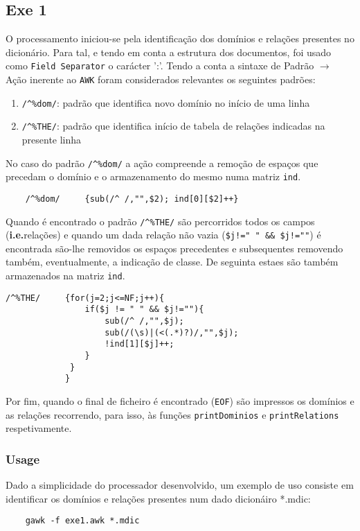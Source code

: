 \documentclass{llncs}
\begin{document}
\subsection{Exe 1}
O processamento iniciou-se pela identificação dos domínios e relações presentes no dicionário. Para tal, e tendo em conta a estrutura dos documentos, foi usado como \texttt{Field Separator} o carácter ':'.
Tendo a conta a sintaxe de Padrão $\to$ Ação inerente ao \texttt{AWK} foram considerados relevantes os seguintes padrões:
\begin{enumerate}
    \item \verb|/^%dom/|: padrão que identifica novo domínio no início de uma linha
    \item \verb|/^%THE/|: padrão que identifica início de tabela de relações indicadas na presente linha
\end{enumerate}
No caso do padrão \verb|/^%dom/| a ação compreende a remoção de espaços que precedam o domínio e o armazenamento do mesmo numa matriz \texttt{ind}.
\begin{Verbatim}
    /^%dom/     {sub(/^ /,"",$2); ind[0][$2]++}
\end{Verbatim}
Quando é encontrado o padrão \verb|/^%THE/| são percorridos todos os campos (\textbf{i.e.}relações) e quando um dada relação não vazia (\verb|$j!=" " && $j!=""|) é encontrada são-lhe removidos os espaços precedentes e subsequentes removendo também, eventualmente, a indicação de classe. De seguinta estaes são também armazenados na matriz \texttt{ind}.
\begin{Verbatim}
/^%THE/     {for(j=2;j<=NF;j++){
                if($j != " " && $j!=""){
                    sub(/^ /,"",$j);           
                    sub(/(\s)|(<(.*)?)/,"",$j);
                    !ind[1][$j]++;
                }                              
             }
            }

\end{Verbatim}

Por fim, quando o final de ficheiro é encontrado (\texttt{EOF}) são impressos os domínios e as relações recorrendo, para isso, às funções \texttt{printDominios} e \texttt{printRelations} respetivamente.

\subsubsection{Usage}
Dado a simplicidade do processador desenvolvido, um exemplo de uso consiste em identificar os domínios e relações presentes num dado dicionáiro *.mdic:
\begin{Verbatim}
    gawk -f exe1.awk *.mdic
\end{Verbatim}
\end{document}
